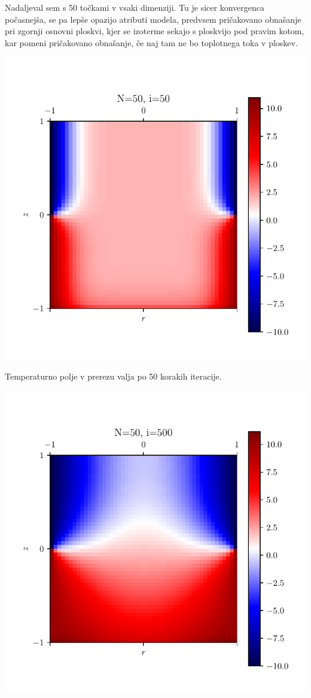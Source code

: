 Nadaljeval sem s 50 točkami v vsaki dimenziji. Tu je sicer konvergenca počasnejša, se pa lepše opazijo atributi modela, predvsem pričakovano obnašanje pri zgornji osnovni ploskvi, kjer se izoterme sekajo s ploskvijo pod pravim kotom, kar pomeni pričakovano obnašanje, če naj tam ne bo toplotnega toka v ploskev.

\begin{center}
    \begin{minipage}{0.45\textwidth}
        \centering
    \includegraphics[width=\textwidth]{../old/2-valj-profili50_50.pdf}
    \caption{Temperaturno polje v prerezu valja po 50 korakih iteracije.}
    \end{minipage}\hfill
    \begin{minipage}{0.45\textwidth}
        \centering
    \includegraphics[width=\textwidth]{../old/2-valj-profili50_500.pdf}

\end{minipage}
\end{center}
